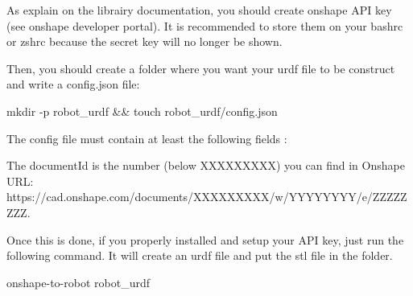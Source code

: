 \bigbreak
As explain on the librairy documentation, you should create onshape API key (see onshape developer portal). It is recommended to store them on your bashrc or zshrc because the secret key will no longer be shown.

\bigbreak
\begin{center}
    \begin{minipage}{10cm}
    \end{minipage}
\end{center}

\bigbreak
Then, you should create a folder where you want your urdf file to be construct and write a config.json file:
\begin{commandshell}
    mkdir -p robot\_urdf && touch robot\_urdf/config.json
\end{commandshell} 

\bigbreak
The config file must contain at least the following fields :
\begin{center}
    \begin{minipage}{8cm}
    \end{minipage}
\end{center}

The documentId is the number (below XXXXXXXXX) you can find in Onshape URL:
\\https://cad.onshape.com/documents/XXXXXXXXX/w/YYYYYYYY/e/ZZZZZZZZ.

\bigbreak
Once this is done, if you properly installed and setup your API key, just run the following command. It will create an urdf file and put the stl file in the folder.
\begin{commandshell}
    onshape-to-robot robot_urdf
\end{commandshell} 

